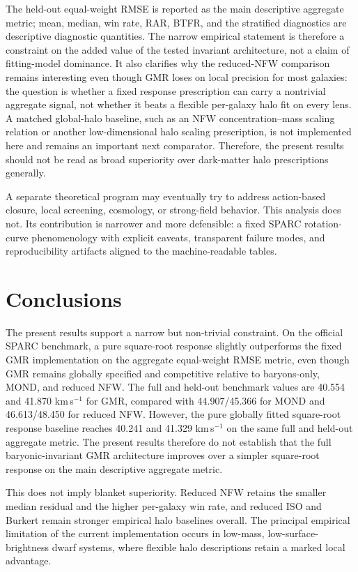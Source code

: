 ﻿\documentclass[twocolumn]{aastex701}
\begin{document}
The held-out equal-weight RMSE is reported as the main descriptive aggregate metric; mean, median, win rate, RAR, BTFR, and the stratified diagnostics are descriptive diagnostic quantities. The narrow empirical statement is therefore a constraint on the added value of the tested invariant architecture, not a claim of fitting-model dominance. It also clarifies why the reduced-NFW comparison remains interesting even though GMR loses on local precision for most galaxies: the question is whether a fixed response prescription can carry a nontrivial aggregate signal, not whether it beats a flexible per-galaxy halo fit on every lens. A matched global-halo baseline, such as an NFW concentration--mass scaling relation or another low-dimensional halo scaling prescription, is not implemented here and remains an important next comparator. Therefore, the present results should not be read as broad superiority over dark-matter halo prescriptions generally.

A separate theoretical program may eventually try to address action-based closure, local screening, cosmology, or strong-field behavior. This analysis does not. Its contribution is narrower and more defensible: a fixed SPARC rotation-curve phenomenology with explicit caveats, transparent failure modes, and reproducibility artifacts aligned to the machine-readable tables.
\section{Conclusions}

The present results support a narrow but non-trivial constraint. On the official SPARC benchmark, a pure square-root response slightly outperforms the fixed GMR implementation on the aggregate equal-weight RMSE metric, even though GMR remains globally specified and competitive relative to baryons-only, MOND, and reduced NFW. The full and held-out benchmark values are 40.554 and 41.870 km\,s$^{-1}$ for GMR, compared with 44.907/45.366 for MOND and 46.613/48.450 for reduced NFW. However, the pure globally fitted square-root response baseline reaches 40.241 and 41.329 km\,s$^{-1}$ on the same full and held-out aggregate metric. The present results therefore do not establish that the full baryonic-invariant GMR architecture improves over a simpler square-root response on the main descriptive aggregate metric.

This does not imply blanket superiority. Reduced NFW retains the smaller median residual and the higher per-galaxy win rate, and reduced ISO and Burkert remain stronger empirical halo baselines overall. The principal empirical limitation of the current implementation occurs in low-mass, low-surface-brightness dwarf systems, where flexible halo descriptions retain a marked local advantage.
\end{document}
